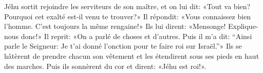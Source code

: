 Jéhu sortit rejoindre les serviteurs de son maître, et on lui dit:
	«Tout va bien? Pourquoi cet exalté est-il venu te trouver?»
	Il répondit: «Vous connaissez bien l’homme. C’est toujours la même rengaine!»
Ils lui dirent: «Mensonge! Explique-nous donc!»
	Il reprit: «On a parlé de choses et d’autres.
Puis il m’a dit: “Ainsi parle le Seigneur:
	Je t’ai donné l’onction pour te faire roi sur Israël.”»
Ils se hâtèrent de prendre chacun son vêtement
	et les étendirent sous ses pieds en haut des marches.
	Puis ils sonnèrent du cor et dirent: «Jéhu est roi!».

